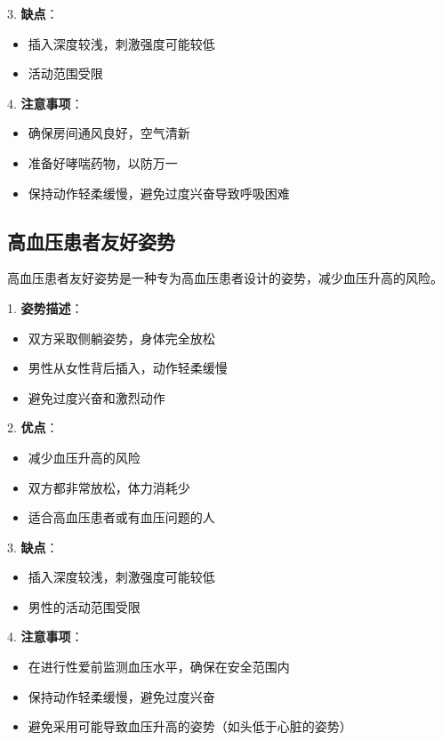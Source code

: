 \documentclass[12pt,UTF8]{ctexbook}
\begin{document}
3. \textbf{缺点}：
  \begin{itemize}
  \item 插入深度较浅，刺激强度可能较低
  \item 活动范围受限
  \end{itemize}

4. \textbf{注意事项}：
  \begin{itemize}
  \item 确保房间通风良好，空气清新
  \item 准备好哮喘药物，以防万一
  \item 保持动作轻柔缓慢，避免过度兴奋导致呼吸困难
  \end{itemize}

\subsection{高血压患者友好姿势}

高血压患者友好姿势是一种专为高血压患者设计的姿势，减少血压升高的风险。

1. \textbf{姿势描述}：
  \begin{itemize}
  \item 双方采取侧躺姿势，身体完全放松
  \item 男性从女性背后插入，动作轻柔缓慢
  \item 避免过度兴奋和激烈动作
  \end{itemize}

2. \textbf{优点}：
  \begin{itemize}
  \item 减少血压升高的风险
  \item 双方都非常放松，体力消耗少
  \item 适合高血压患者或有血压问题的人
  \end{itemize}

3. \textbf{缺点}：
  \begin{itemize}
  \item 插入深度较浅，刺激强度可能较低
  \item 男性的活动范围受限
  \end{itemize}

4. \textbf{注意事项}：
  \begin{itemize}
  \item 在进行性爱前监测血压水平，确保在安全范围内
  \item 保持动作轻柔缓慢，避免过度兴奋
  \item 避免采用可能导致血压升高的姿势（如头低于心脏的姿势）
  \end{itemize}
\end{document}
